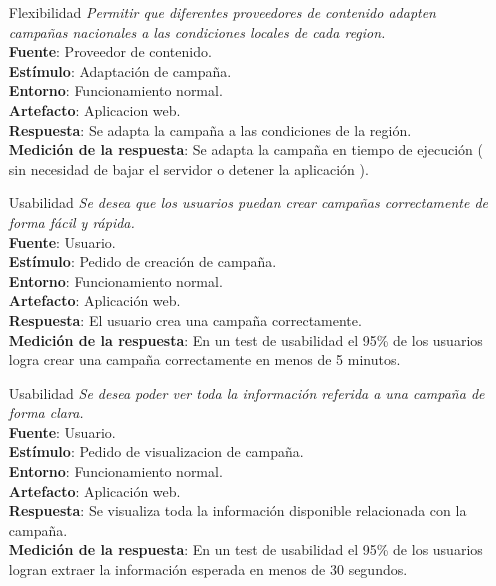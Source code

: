 \documentclass[a4paper, 11pt]{article}
\begin{document}
\begin{itemize}
\item[Flexibilidad] \textit{Permitir que diferentes proveedores de contenido adapten campañas nacionales a las condiciones locales de cada region.} \\
\textbf{Fuente}:  Proveedor de contenido.  \\
\textbf{Estímulo}: Adaptación de campaña. \\
\textbf{Entorno}: Funcionamiento normal. \\
\textbf{Artefacto}: Aplicacion web. \\
\textbf{Respuesta}: Se adapta la campaña a las condiciones de la región. \\
\textbf{Medición de la respuesta}: Se adapta la campaña en tiempo de ejecución ( sin necesidad de bajar el servidor o detener la aplicación ). \\

\item[Usabilidad] \textit{Se desea que los usuarios puedan crear campañas correctamente de forma fácil y rápida.} \\
\textbf{Fuente}:  Usuario. \\
\textbf{Estímulo}: Pedido de creación de campaña. \\
\textbf{Entorno}: Funcionamiento normal. \\
\textbf{Artefacto}: Aplicación web. \\
\textbf{Respuesta}: El usuario crea una campaña correctamente. \\
\textbf{Medición de la respuesta}: En un test de usabilidad el 95\% de los usuarios logra crear una campaña correctamente en menos de 5 minutos. \\

\item[Usabilidad] \textit{Se desea poder ver toda la información referida a una campaña de forma clara.} \\
\textbf{Fuente}:  Usuario. \\
\textbf{Estímulo}: Pedido de visualizacion de campaña. \\
\textbf{Entorno}: Funcionamiento normal. \\
\textbf{Artefacto}: Aplicación web. \\
\textbf{Respuesta}: Se visualiza toda la información disponible relacionada con la campaña. \\
\textbf{Medición de la respuesta}: En un test de usabilidad el 95\% de los usuarios logran extraer la información esperada en menos de 30 segundos. \\


\end{itemize}
\end{document}
